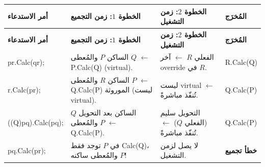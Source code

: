 \documentclass[14pt]{extarticle}
\begin{document}
\begin{center}
\begin{english}
\end{english}
\end{center}

{\renewcommand{\arraystretch}{1.2}
\small
\begin{longtable}{|>{\raggedright\arraybackslash}p{}|>{\raggedleft\arraybackslash}p{}|>{\raggedleft\arraybackslash}p{}|>{\raggedright\arraybackslash}p{}|}
\hline
\textbf{أمر الاستدعاء} & \textbf{الخطوة $1$: زمن التجميع} & \textbf{الخطوة $2$: زمن التشغيل} & \textbf{المُخرَج} \\
\hline
\endfirsthead
\hline
\textbf{أمر الاستدعاء} & \textbf{الخطوة $1$: زمن التجميع} & \textbf{الخطوة $2$: زمن التشغيل} & \textbf{المُخرَج} \\
\hline
\endhead
\textenglish{pr.Calc(qr);} &
الساكن $P$ والمُعطى $Q$ $\leftarrow$ \textenglish{P.Calc(Q)} (\textenglish{virtual}). &
الفعلي $R$ $\leftarrow$ آخر \textenglish{override} في $R$. &
\textenglish{R.Calc(Q)} \\
\hline
\textenglish{r.Calc(pr);} &
الساكن $R$ والمُعطى $P$ $\leftarrow$ \textenglish{Q.Calc(P)} الموروثة (ليست \textenglish{virtual}). &
ليست \textenglish{virtual} $\leftarrow$ تُنفّذ مباشرةً. &
\textenglish{Q.Calc(P)} \\
\hline
\textenglish{((Q)pq).Calc(pq);} &
الساكن بعد التحويل $Q$ والمُعطى $P$ $\leftarrow$ \textenglish{Q.Calc(P)}. &
التحويل سليم (الفعلي $Q$) $\leftarrow$ تُنفّذ مباشرةً. &
\textenglish{Q.Calc(P)} \\
\hline
\textenglish{pq.Calc(pr);} &
في $P$ توجد فقط \textenglish{Calc(Q)}، والمُعطى ساكنه $P$! &
لا يصل لزمن التشغيل. &
\textarabic{\textbf{خطأ تجميع}} \\
\hline
\end{longtable}}
\end{document}

